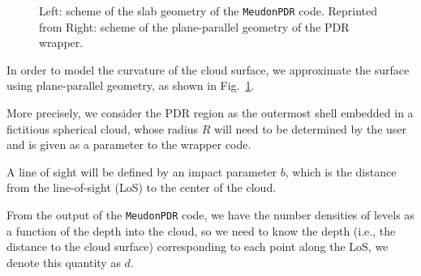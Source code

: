 \documentclass[12pt,a4paper]{article}
\newcommand{\mdpdr}{\texttt{MeudonPDR} code}
\begin{document}
\begin{figure}
    \centering
    \hfill
    \caption{Left: scheme of the slab geometry of the \mdpdr{}. Reprinted from \textcite{LePetit2006} Right: scheme of the plane-parallel geometry of the PDR wrapper.} \label{fig:geometry}
\end{figure}

In order to model the curvature of the cloud surface, we approximate the surface using plane-parallel geometry, as shown in Fig.~\ref{fig:geometry}.

More precisely, we consider the PDR region as the outermost shell embedded in a fictitious spherical cloud, whose radius $R$ will need to be determined by the user and is given as a parameter to the wrapper code.

A line of sight will be defined by an impact parameter $b$, which is the distance from the line-of-sight (LoS) to the center of the cloud. 

From the output of the \mdpdr{}, we have the number densities of levels as a function of the depth into the cloud, so we need to know the depth (i.e., the distance to the cloud surface) corresponding to each point along the LoS, we denote this quantity as $d$.
\end{document}
